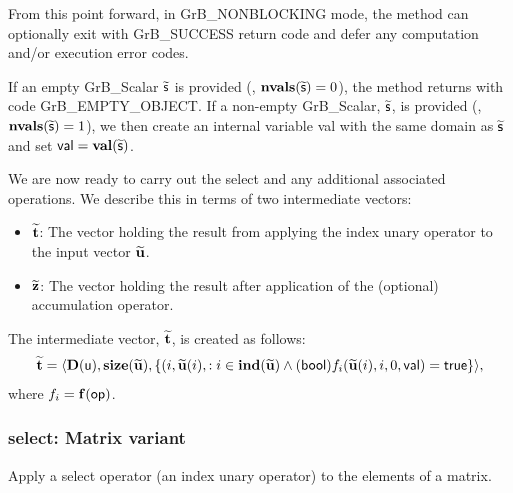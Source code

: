 From this point forward, in {\sf GrB\_NONBLOCKING} mode, the method can optionally exit 
with {\sf GrB\_SUCCESS} return code and defer any computation and/or execution error codes.

If an empty {\sf GrB\_Scalar} $\widetilde{\sf s}$ is provided (\ie, $\mathbf{nvals}(\widetilde{\sf s}) = 0$),
the method returns with code {\sf GrB\_EMPTY\_OBJECT}. If a non-empty {\sf GrB\_Scalar}, 
$\widetilde{\sf s}$, is provided (\ie, $\mathbf{nvals}(\widetilde{\sf s}) = 1$), we then create an 
internal variable {\sf val} with the same domain as $\widetilde{\sf s}$ and set 
${\sf val} = \mathbf{val}(\widetilde{\sf s})$.

We are now ready to carry out the {\sf select} and any additional 
associated operations.  We describe this in terms of two intermediate vectors:
\begin{itemize}
    \item ${\bf \widetilde{t}}$: The vector holding the result from applying the index unary operator to the input vector
    ${\bf \widetilde{u}}$.
    \item ${\bf \widetilde{z}}$: The vector holding the result after 
    application of the (optional) accumulation operator.
\end{itemize}

The intermediate vector, ${\bf \widetilde{t}}$, is created as follows:
\[
\begin{aligned}
{\bf \widetilde{t}} &= \langle
\bold{D}({\sf u}), \bold{size}({\bf \widetilde{u}}),
\{(i,{\bf \widetilde{u}}(i), : i \in \bold{ind}({\bf \widetilde{u}}) \wedge ({\sf bool})f_i({\bf \widetilde{u}}(i),i,0,{\sf val}) = {\sf true} \} \rangle, \\
\end{aligned}
\]
where $f_{i} = \mathbf{f}({\sf op})$.






\subsubsection{{\sf select}: Matrix variant}

Apply a select operator (an index unary operator) to the elements of a matrix.

\paragraph{\syntax}

